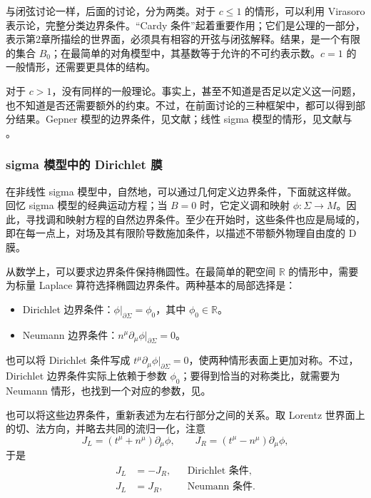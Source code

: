与闭弦讨论一样，后面的讨论，分为两类。对于 $c\le1$ 的情形，可以利用 Virasoro 表示论，完整分类边界条件。“Cardy 条件”起着重要作用；它们是公理的一部分，表示第2章所描绘的世界面，必须具有相容的开弦与闭弦解释。结果，是一个有限的集合 $B_0$；在最简单的对角模型中，其基数等于允许的不可约表示数。$c=1$ 的一般情形，还需要更具体的结构。

对于 $c>1$，没有同样的一般理论。事实上，甚至不知道是否足以定义这一问题，也不知道是否还需要额外的约束。不过，在前面讨论的三种框架中，都可以得到部分结果。Gepner 模型的边界条件，见文献；线性 sigma 模型的情形，见文献与 。

\subsubsection{sigma 模型中的 Dirichlet 膜}\label{sec:3.5.2.1}

在非线性 sigma 模型中，自然地，可以通过几何定义边界条件，下面就这样做。回忆 sigma 模型的经典运动方程；当 $B=0$ 时，它定义调和映射 $\phi\colon\Sigma\to M$。因此，寻找调和映射方程的自然边界条件。至少在开始时，这些条件也应是局域的，即在每一点上，对场及其有限阶导数施加条件，以描述不带额外物理自由度的 D 膜。

从数学上，可以要求边界条件保持椭圆性。在最简单的靶空间 $\mathbb{R}$ 的情形中，需要为标量 Laplace 算符选择椭圆边界条件。两种基本的局部选择是：
\begin{definition*}\label{def:3.dirichlet-neumann-boundary}
\begin{itemize}
\item Dirichlet 边界条件：$\phi|_{\partial\Sigma}=\phi_0$，其中 $\phi_0\in\mathbb{R}$。
\item Neumann 边界条件：$n^\mu\partial_\mu\phi|_{\partial\Sigma}=0$。
\end{itemize}
\end{definition*}
也可以将 Dirichlet 条件写成 $t^\mu\partial_\mu\phi|_{\partial\Sigma}=0$，使两种情形表面上更加对称。不过，Dirichlet 边界条件实际上依赖于参数 $\phi_0$；要得到恰当的对称类比，就需要为 Neumann 情形，也找到一个对应的参数，见。

也可以将这些边界条件，重新表述为左右行部分之间的关系。取 Lorentz 世界面上的切、法方向，并略去共同的流归一化，注意
\begin{equation}\label{eq:3.138}
J_L=(t^\mu+n^\mu)\partial_\mu\phi,
\qquad J_R=(t^\mu-n^\mu)\partial_\mu\phi,
\end{equation}
于是
\begin{equation}\label{eq:3.139}
\begin{aligned}
J_L&=-J_R,&&\text{Dirichlet 条件},\\
J_L&=J_R,&&\text{Neumann 条件}.
\end{aligned}
\end{equation}

